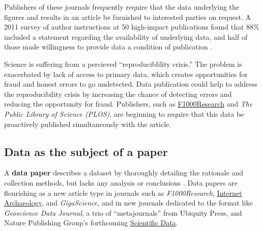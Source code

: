 \documentclass[10pt,a4paper,twocolumn]{article}
\begin{document}
Publishers of these journals frequently require that the data underlying the figures and results in an article be furnished to interested parties on request.
A 2011 survey of author instructions at 50 high-impact publications found that 88\% included a statement regarding the availability of underlying data, and half of those made willingness to provide data a condition of publication \cite{alsheikh_public_2011}.

Science is suffering from a percieved ``reproduciblility crisis.''\cite{mobley_a_2013,pashler_is_2012,zimmer_rise_2012,hiltzik_science_2013,begley_drug_2012,collins_nih_2014}
The problem is exacerbated by lack of access to primary data, which creates opportunities for fraud and honest errors to go undetected.
Data publication could help to address the reproducibility crisis by increasing the chance of detecting errors and reducing the opportunity for fraud.\cite{drew_lost_2013}
Publishers, such as \href{http://f1000research.com}{F1000Research} and \emph{The Public Library of Science (PLOS)}\cite{bloom_data_2014}, are beginning to require that this data be proactively published simultaneously with the article.

% 


\subsection*{Data as the subject of a paper}\label{paper-subject-data}

A \textbf{data paper} describes a dataset by thoroughly detailing the rationale and collection methods, but lacks any analysis or conclusions \cite{newman_data_2009}. 
Data papers are flourishing as a new article type in journals such as \emph{F1000Research}, \href{http://www.internetarchaeology.org/}{Internet Archaeology}, and \emph{GigaScience}\cite{gigascience}, and in new journals dedicated to the format like \emph{Geoscience Data Journal}\cite{geoscience_data_journal}, a trio of ``metajournals'' from Ubiquity Press, and Nature Publishing Group's forthcoming \href{http://www.nature.com/scientificdata/}{Scientific Data}.
\end{document}
